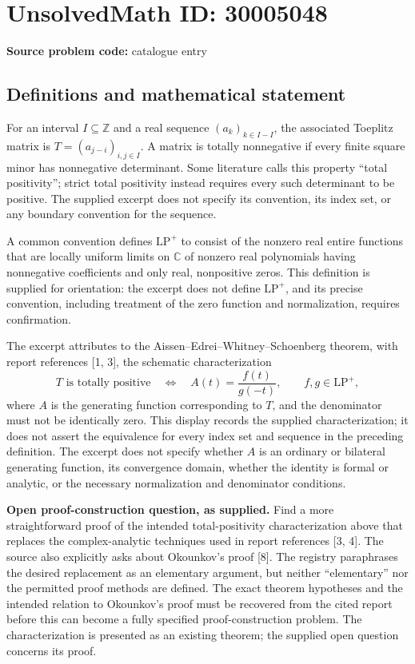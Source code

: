 \documentclass[11pt]{article}
\newcommand{\Z}{\mathbb{Z}}
\newcommand{\C}{\mathbb{C}}
\begin{document}
\section*{UnsolvedMath ID: 30005048}
\textbf{Source problem code:} catalogue entry
\subsection{Definitions and mathematical statement}
For an interval \(I\subseteq\Z\) and a real sequence \((a_k)_{k\in I-I}\), the associated Toeplitz matrix is \(T=(a_{j-i})_{i,j\in I}\). A matrix is totally nonnegative if every finite square minor has nonnegative determinant. Some literature calls this property ``total positivity''; strict total positivity instead requires every such determinant to be positive. The supplied excerpt does not specify its convention, its index set, or any boundary convention for the sequence.

A common convention defines \(\mathrm{LP}^{+}\) to consist of the nonzero real entire functions that are locally uniform limits on \(\C\) of nonzero real polynomials having nonnegative coefficients and only real, nonpositive zeros. This definition is supplied for orientation: the excerpt does not define \(\mathrm{LP}^{+}\), and its precise convention, including treatment of the zero function and normalization, requires confirmation.

The excerpt attributes to the Aissen--Edrei--Whitney--Schoenberg theorem, with report references [1, 3], the schematic characterization
\[
 T\text{ is totally positive}
 \quad\Longleftrightarrow\quad
 A(t)=\frac{f(t)}{g(-t)},\qquad f,g\in\mathrm{LP}^{+},
\]
where \(A\) is the generating function corresponding to \(T\), and the denominator must not be identically zero. This display records the supplied characterization; it does not assert the equivalence for every index set and sequence in the preceding definition. The excerpt does not specify whether \(A\) is an ordinary or bilateral generating function, its convergence domain, whether the identity is formal or analytic, or the necessary normalization and denominator conditions.

\textbf{Open proof-construction question, as supplied.} Find a more straightforward proof of the intended total-positivity characterization above that replaces the complex-analytic techniques used in report references [3, 4]. The source also explicitly asks about Okounkov's proof [8]. The registry paraphrases the desired replacement as an elementary argument, but neither ``elementary'' nor the permitted proof methods are defined. The exact theorem hypotheses and the intended relation to Okounkov's proof must be recovered from the cited report before this can become a fully specified proof-construction problem. The characterization is presented as an existing theorem; the supplied open question concerns its proof.
\end{document}
